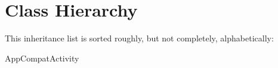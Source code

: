\section{Class Hierarchy}
This inheritance list is sorted roughly, but not completely, alphabetically\+:\begin{DoxyCompactList}
\item App\+Compat\+Activity\begin{DoxyCompactList}
\item {}
\end{DoxyCompactList}
\end{DoxyCompactList}
